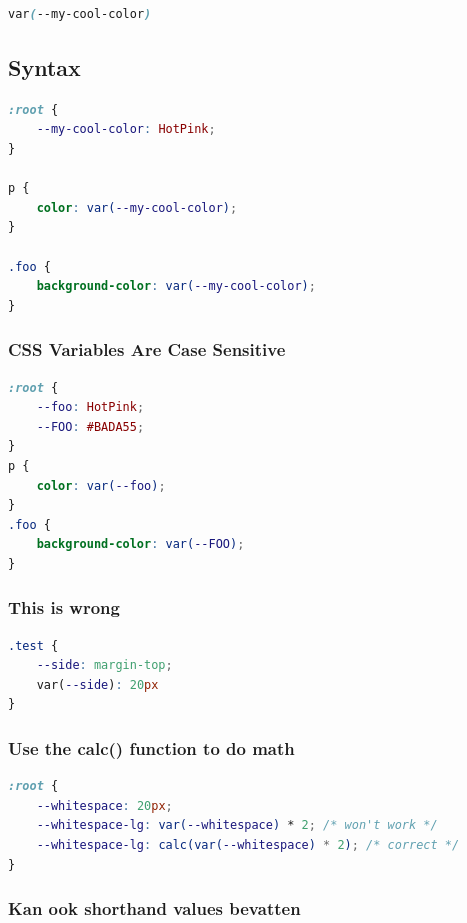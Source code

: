 \documentclass{article}
\begin{document}
\begin{lstlisting}[language=CSS]
var(--my-cool-color)
\end{lstlisting}

\subsection{Syntax}

\begin{lstlisting}[language=CSS]
:root {
    --my-cool-color: HotPink;
}

p {
    color: var(--my-cool-color);
}

.foo {
    background-color: var(--my-cool-color);
}
\end{lstlisting}

\subsubsection{CSS Variables Are Case Sensitive}

\begin{lstlisting}[language=CSS]
:root {
    --foo: HotPink;
    --FOO: #BADA55;
}
p {
    color: var(--foo);
}
.foo {
    background-color: var(--FOO);
}
\end{lstlisting}


\subsubsection{This is wrong}

\begin{lstlisting}[language=CSS]
.test {
    --side: margin-top;
    var(--side): 20px
}
\end{lstlisting}

\subsubsection{Use the calc() function to do math}

\begin{lstlisting}[language=CSS]
:root {
    --whitespace: 20px;
    --whitespace-lg: var(--whitespace) * 2; /* won't work */
    --whitespace-lg: calc(var(--whitespace) * 2); /* correct */
}
\end{lstlisting}

\subsubsection{Kan ook shorthand values bevatten}
\end{document}
